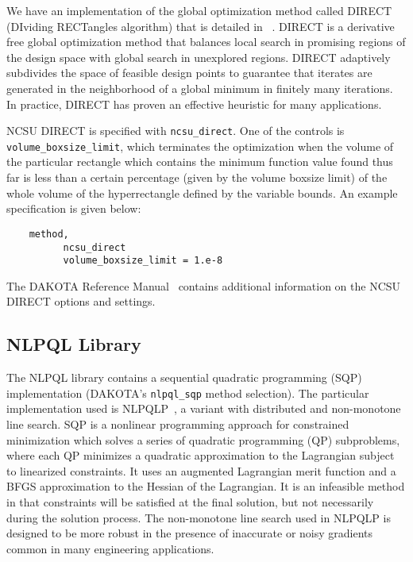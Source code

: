 We have an implementation of the global optimization method called
DIRECT (DIviding RECTangles algorithm) that is detailed in
~\cite{Gab01}. DIRECT is a derivative free global optimization method
that balances local search in promising regions of the design space
with global search in unexplored regions.  DIRECT adaptively
subdivides the space of feasible design points to guarantee that
iterates are generated in the neighborhood of a global minimum in
finitely many iterations.  In practice, DIRECT has proven an effective
heuristic for many applications.

NCSU DIRECT is specified with \texttt{ncsu\_direct}. One of the
controls is \texttt{volume\_boxsize\_limit}, which terminates the
optimization when the volume of the particular rectangle which contains
the minimum function value found thus far
is less than a certain percentage (given by the volume boxsize limit) of
the whole volume of the hyperrectangle defined by the variable bounds.
An example specification is given below:
\begin{small}
\begin{verbatim}
    method,
          ncsu_direct
          volume_boxsize_limit = 1.e-8
\end{verbatim}
\end{small}

The DAKOTA Reference Manual~\cite{RefMan} contains additional
information on the NCSU DIRECT options and settings.

\subsection{NLPQL Library}\label{opt:software:nlpql}

The NLPQL library contains a sequential quadratic programming (SQP)
implementation (DAKOTA's \texttt{nlpql\_sqp} method selection).  The
particular implementation used is NLPQLP~\cite{Sch04}, a variant with
distributed and non-monotone line search.  SQP is a nonlinear
programming approach for constrained minimization which solves a
series of quadratic programming (QP) subproblems, where each QP
minimizes a quadratic approximation to the Lagrangian subject to
linearized constraints. It uses an augmented Lagrangian merit function
and a BFGS approximation to the Hessian of the Lagrangian. It is an
infeasible method in that constraints will be satisfied at the final
solution, but not necessarily during the solution process.  The
non-monotone line search used in NLPQLP is designed to be more robust
in the presence of inaccurate or noisy gradients common in many
engineering applications.

